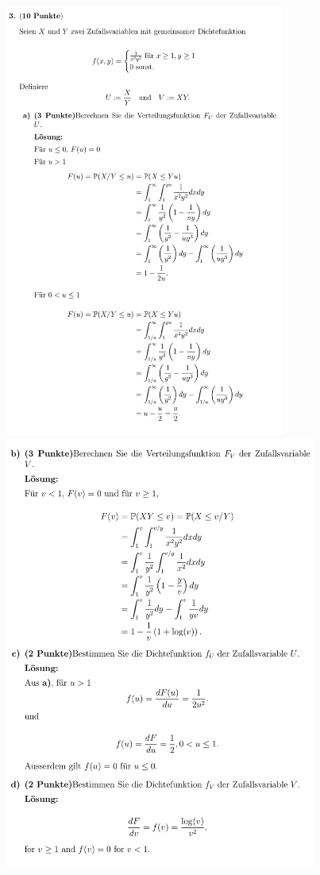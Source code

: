 \includegraphics[height=143mm]{old_exams_prtsrc/tei_infk_so17_ml-10.png}\newline
\includegraphics[height=143mm]{old_exams_prtsrc/tei_infk_so17_ml-11.png}\newline
